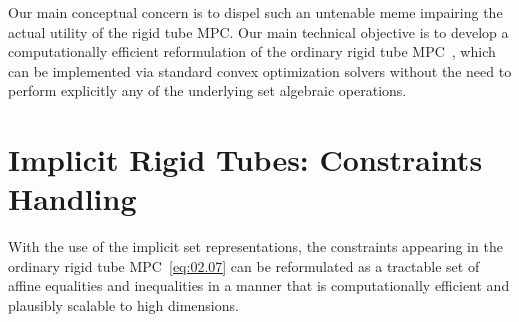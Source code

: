 \documentclass[twocolumn]{autart}
\numberwithin{equation}{section}
\begin{document}
Our main conceptual concern is to dispel such an untenable meme impairing the actual utility of the rigid tube MPC. Our main technical objective is to develop a computationally efficient reformulation of the ordinary rigid tube MPC~\cite{mayne:seron:rakovic:2005}, which can be implemented via standard convex optimization solvers without the need to perform explicitly any of the underlying set algebraic operations. 


\section{Implicit Rigid Tubes: Constraints Handling}
\label{sec:03}

With the use of the implicit set representations, the constraints appearing in the ordinary rigid tube MPC~\eqref{eq:02.07} can be reformulated as a tractable set of affine equalities and inequalities in a manner that is computationally efficient and plausibly scalable to high dimensions. 

\end{document}

